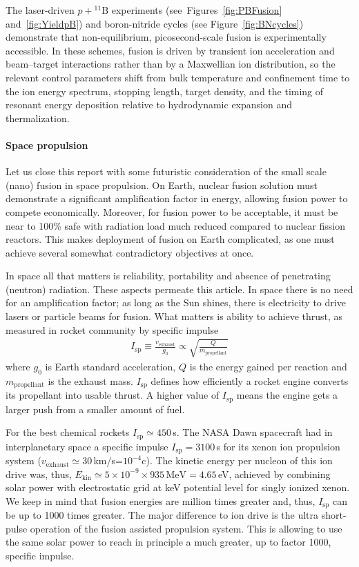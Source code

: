 \documentclass[particles,article,accept,pdftex,moreauthors]{Definitions/mdpi}
\begin{document}
The laser-driven $p+{}^{11}\mathrm{B}$ experiments (see~Figures~\ref{fig:PBFusion} and~\ref{fig:YieldpB}) and boron-nitride cycles (see Figure~\ref{fig:BNcycles}) demonstrate that non-equilibrium, picosecond-scale fusion is experimentally accessible. In these schemes, fusion is driven by transient ion acceleration and beam--target interactions rather than by a Maxwellian ion distribution, so the relevant control parameters shift from bulk temperature and confinement time to the ion energy spectrum, stopping length, target density, and the timing of resonant energy deposition relative to hydrodynamic expansion and thermalization. 


\paragraph*{\bf Space propulsion}
Let us close this report with some futuristic consideration of the small scale (nano) fusion in space propulsion. On Earth, nuclear fusion solution must demonstrate a significant amplification factor in energy, allowing fusion power to compete economically. Moreover, for fusion power to be acceptable, it must be near to 100\% safe with radiation load much reduced compared to nuclear fission reactors. This makes deployment of fusion on Earth complicated, as one must achieve several somewhat contradictory objectives at once. 

In space all that matters is reliability, portability and absence of penetrating (neutron) radiation. These aspects permeate this article. In space there is no need for an amplification factor; as long as the Sun shines, there is electricity to drive lasers or particle beams for fusion. What matters is ability to achieve thrust, as measured in rocket community by specific impulse 
\begin{align}
I_\mathrm{sp}\equiv\frac{v_\mathrm{exhaust}}{g_0} \propto \sqrt{\frac{Q}{m_\mathrm{propellant}}}
\end{align}
where $g_0$ is Earth standard acceleration, $Q$ is the energy gained per reaction and $m_\mathrm{propellant}$ is the exhaust mass. $I_\mathrm{sp}$ defines how efficiently a rocket engine converts its propellant into usable thrust. A higher value of $I_\mathrm{sp}$ means the engine gets a larger push from a smaller amount of fuel. 

For the best chemical rockets $I_\mathrm{sp}\simeq 450$\,s. The NASA Dawn spacecraft had in interplanetary space a specific impulse $I_\mathrm{sp}=3100$\,s for its xenon ion propulsion system ($v_\mathrm{exhaust}\simeq 30$\,km/s=$10^{-4}$c). The kinetic energy per nucleon of this ion drive was, thus, $E_\mathrm{kin}\simeq 5\times 10^{-9}\times935\,\mathrm{MeV}=4.65$\,eV, achieved by combining solar power with electrostatic grid at keV potential level for singly ionized xenon. We keep in mind that fusion energies are million times greater and, thus, $I_\mathrm{sp}$ can be up to 1000 times greater. The major difference to ion drive is the ultra short-pulse operation of the fusion assisted propulsion system. This is allowing to use the same solar power to reach in principle a much greater, up to factor 1000, specific impulse.
\end{document}
